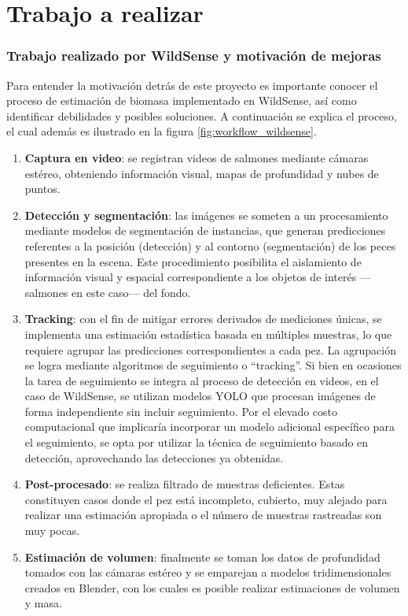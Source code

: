 \part*{Trabajo a realizar}
\section{Trabajo realizado por WildSense y motivación de mejoras}
Para entender la motivación detrás de este proyecto es importante conocer el proceso de estimación de biomasa implementado en WildSense, así como identificar debilidades y posibles soluciones. A continuación se explica el proceso, el cual además es ilustrado en la figura \ref{fig:workflow_wildsense}.

\begin{enumerate}
    \item \textbf{Captura en video}: se registran videos de salmones mediante cámaras estéreo, obteniendo información visual, mapas de profundidad y nubes de puntos.
    \item \textbf{Detección y segmentación}: las imágenes se someten a un procesamiento mediante modelos de segmentación de instancias, que generan predicciones referentes a la posición (detección) y al contorno (segmentación) de los peces presentes en la escena. Este procedimiento posibilita el aislamiento de información visual y espacial correspondiente a los objetos de interés ---salmones en este caso--- del fondo.
    \item \textbf{Tracking}: con el fin de mitigar errores derivados de mediciones únicas, se implementa una estimación estadística basada en múltiples muestras, lo que requiere agrupar las predicciones correspondientes a cada pez. La agrupación se logra mediante algoritmos de seguimiento o ``tracking''. Si bien en ocasiones la tarea de seguimiento se integra al proceso de detección en videos, en el caso de WildSense, se utilizan modelos YOLO que procesan imágenes de forma independiente sin incluir seguimiento. Por el elevado costo computacional que implicaría incorporar un modelo adicional específico para el seguimiento, se opta por utilizar la técnica de seguimiento basado en detección, aprovechando las detecciones ya obtenidas.
    \item \textbf{Post-procesado}: se realiza filtrado de muestras deficientes. Estas constituyen casos donde el pez está incompleto, cubierto, muy alejado para realizar una estimación apropiada o el número de muestras rastreadas son muy pocas.
    \item \textbf{Estimación de volumen}: finalmente se toman los datos de profundidad tomados con las cámaras estéreo y se emparejan a modelos tridimensionales creados en Blender, con los cuales es posible realizar estimaciones de volumen y masa.
\end{enumerate}

